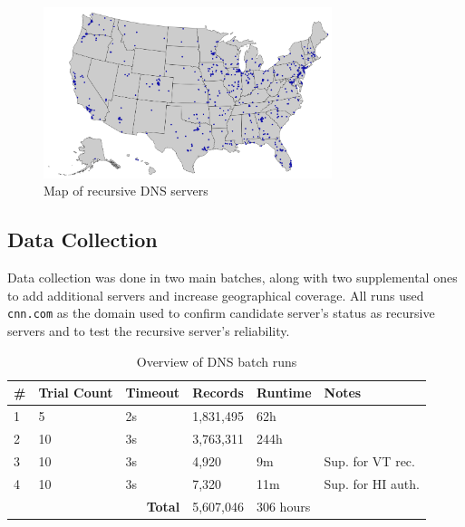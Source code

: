\begin{figure}[htb]
    \centering
    \includegraphics[width=0.75\textwidth]{images/dns/server_locations/rec_server_locations.png}
    \caption{Map of recursive DNS servers}
    \label{fig:dns_cache_manipulation_map_of_recursive_servers}
\end{figure}

\subsection{Data Collection}

Data collection was done in two main batches, along with two supplemental ones to add additional servers and increase geographical coverage. All runs used \texttt{cnn.com} as the domain used to confirm candidate server's status as recursive servers and to test the recursive server's reliability.

\begin{table}[htb]
    \centering
    \begin{tabular}{p{1cm}||p{2cm}|p{2cm}|p{2cm}|p{2cm}|p{4cm} }
     \textbf{\#} & \textbf{Trial Count} & \textbf{Timeout} & \textbf{Records} & \textbf{Runtime} & \textbf{Notes} \\
     \hline
     1 & 5 & 2s & 1,831,495 & 62h & \\
     2 & 10 & 3s & 3,763,311 & 244h & \\
     3 & 10 & 3s & 4,920 & 9m  & Sup. for VT rec. \\
     4 & 10 & 3s & 7,320 & 11m & Sup. for HI auth. \\
     \hline
     \multicolumn{3}{r|}{\textbf{Total}} & 5,607,046 & 306 hours & \\
    \end{tabular}
    \caption{Overview of DNS batch runs}
    \label{tab:dns_batch_overview}
\end{table}


